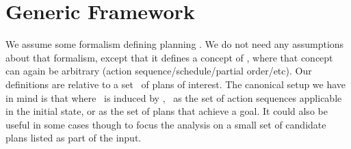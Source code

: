 \section{Generic Framework}
\label{framework}

%

We assume some formalism defining planning  \task. We
do not need any assumptions about that formalism, except that it
defines a concept of  \plan, where that concept can
again be arbitrary (action sequence/schedule/partial order/etc). 
%
Our definitions are relative to a set \plans\ of plans of
interest. The canonical setup we have in mind is that where \plans\ is
induced by \task, \eg\ as the set of action sequences applicable in
the initial state, or as the set of plans that achieve a goal. It
could also be useful in some cases though to focus the analysis on a
small set of candidate plans listed as part of the input.


%


